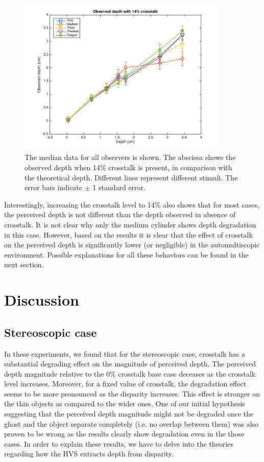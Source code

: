 \begin{figure}[H]
\centering
    \includegraphics[width=0.9\textwidth]{./Template_Figures/a_crosstalk_14}
    \caption{The median data for all observers is shown. The abscissa shows the observed depth when 14\% crosstalk is present, in comparison with the theoretical depth. Different lines represent different stimuli. The error bars indicate $\pm$ 1 standard error.\label{fig:a_crosstalk_14}}
\end{figure}
Interestingly, increasing the crosstalk level to 14\% also shows that for most cases, the perceived depth is not different than the depth observed in absence of crosstalk. It is not clear why only the medium cylinder shows depth degradation in this case. However, based on the results it is clear that the effect of crosstalk on the perceived depth is significantly lower (or negligible) in the automultiscopic environment. Possible explanations for all these behaviors can be found in the next section.

\section {Discussion}
\subsection{Stereoscopic case}
In these experiments, we found that for the stereoscopic case, crosstalk has a substantial degrading effect on the magnitude of perceived depth. The perceived depth magnitude relative to the 0\% crosstalk base case deceases as the crosstalk level increases. Moreover, for a fixed value of crosstalk, the degradation effect seems to be more pronounced as the disparity increases. This effect is stronger on the thin objects as compared to the wider ones. One of our initial hypothesis suggesting that the perceived depth magnitude might not be degraded once the ghost and the object separate completely (i.e. no overlap between them) was also proven to be wrong as the results clearly show degradation even in the those cases. In order to explain these results, we have to delve into the theories regarding how the HVS extracts depth from disparity.

